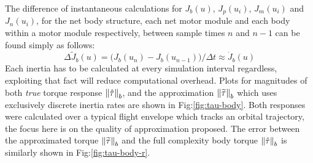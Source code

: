 \par
The difference of instantaneous calculations for $J_b(u)$, $J_p(u_i)$, $J_m(u_i)$ and $J_n(u_i)$, for the net body structure, each net motor module and each body within a motor module respectively, between sample times $n$ and $n-1$ can be found simply as follows:
\begin{equation}\label{eq:discrete-inertia-approximation}
\Delta\widetilde{J}_b(u)=\big(J_b(u_n)-J_b(u_{n-1})\big)/\Delta t\approx\dot{J}_b(u)
\end{equation}
Each inertia has to be calculated at every simulation interval regardless, exploiting that fact will reduce computational overhead. Plots for magnitudes of both \emph{true} torque response $\left\lVert\hat{\tau}\right\rVert_b$, and the approximation $\left\lVert\widetilde{\tau}\right\rVert_b$ which uses exclusively discrete inertia rates are shown in Fig:\ref{fig:tau-body}. Both responses were calculated over a typical flight envelope which tracks an orbital trajectory, the focus here is on the quality of approximation proposed. The error between the approximated torque $\left\lVert\widetilde{\tau}\right\rVert_b$ and the full complexity body torque $\left\lVert\hat{\tau}\right\rVert_b$ is similarly shown in Fig:\ref{fig:tau-body-r}.
